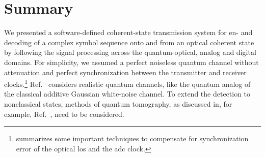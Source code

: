 \section*{Summary}

We presented a software-defined coherent-state transmission system for en- and decoding of a complex symbol sequence onto and from an optical coherent state by following the signal processing across the quantum-optical, analog and digital domains.
For simplicity, we assumed a perfect noiseless quantum channel without attenuation and perfect synchronization between the transmitter and receiver clocks.\footnote{ summarizes some important techniques to compensate for synchronization error of the optical \glspl{lo} and the \gls{adc} clock.}
Ref.~\cite{Nielsen2010} considers realistic quantum channels, like the quantum analog of the classical additive Gaussian white-noise channel.
To extend the detection to nonclassical states, methods of quantum tomography, as discussed in, for example, Ref.~\cite{Vogel2006}, need to be considered.

